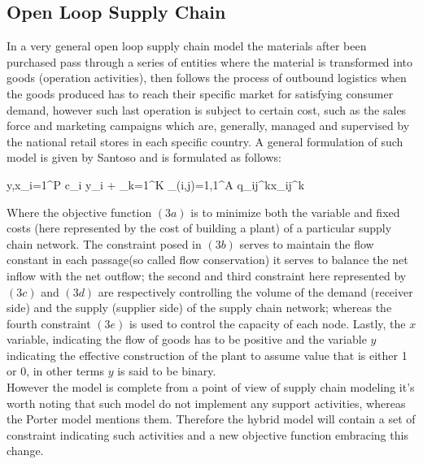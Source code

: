 \documentclass{article}
\begin{document}
\subsection{Open Loop Supply Chain}
In a very general open loop supply chain model the materials after been purchased pass through a series of entities where the material is transformed into goods (operation activities), then follows the process of outbound logistics when the goods produced has to reach their specific market for satisfying consumer demand, however such last operation is subject to certain cost, such as the sales force and marketing campaigns which are, generally, managed and supervised by the national retail stores in each specific country.
A general formulation of such model is given by Santoso and is formulated as follows:
\begin{mini!}
	{y,x}{\sum_{i=1}^{P} c_i y_i  + \sum_{k=1}^{K} \sum_{(i,j)=1,1}^{A} q_{ij}^{k}x_{ij}^{k}}{}{}
\end{mini!}

Where the objective function $(3a)$ is to minimize both the variable and fixed costs (here represented by the cost of building a plant) of a particular supply chain network.
The constraint posed in $(3b)$ serves to maintain the flow constant in each passage(so called flow conservation) it serves to balance the net inflow with the net outflow; the second and third constraint here represented by $(3c)$ and $(3d)$ are respectively controlling the volume of the demand (receiver side) and the supply (supplier side) of the supply chain network; whereas the fourth constraint $(3e)$ is used to control the capacity of each node. Lastly, the $x$ variable, indicating the flow of goods has to be positive and the variable $y$ indicating the effective construction of the plant to assume value that is either 1 or 0, in other terms $y$ is said to be binary. 
\\
However the model is complete from a point of view of supply chain modeling it's worth noting that such model do not implement any support activities, whereas the Porter model mentions them. Therefore the hybrid model will contain a set of constraint indicating such activities and a new objective function embracing this change.
\end{document}
